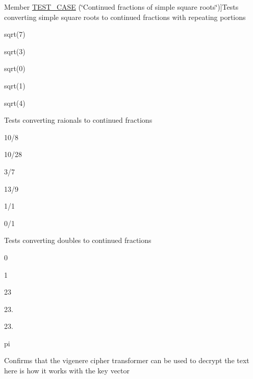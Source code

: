 \begin{DoxyRefList}
\hypertarget{test__test000014}{}%
Member \hyperlink{test__continuedfraction_8cpp_aa4e3cd0ec8e9303b450e5e393efa22b4}{T\+E\+S\+T\+\_\+\+C\+A\+SE} (\char`\"{}\+Continued fractions of simple square roots\char`\"{})]Tests converting simple square roots to continued fractions with repeating portions
\begin{DoxyItemize}
\item sqrt(7)
\item sqrt(3)
\item sqrt(0)
\item sqrt(1)
\item sqrt(4)  
\end{DoxyItemize}
\item[\label{test__test000013}%
\hypertarget{test__test000013}{}%
Member \hyperlink{test__continuedfraction_8cpp_a6494869677218c6bdd53aa492fbaa510}{T\+E\+S\+T\+\_\+\+C\+A\+SE} (\char`\"{}\+Fraction to continued fraction\char`\"{})]Tests converting raionals to continued fractions
\begin{DoxyItemize}
\item 10/8
\item 10/28
\item 3/7
\item 13/9
\item 1/1
\item 0/1  
\end{DoxyItemize}
\item[\label{test__test000012}%
\hypertarget{test__test000012}{}%
Member \hyperlink{test__continuedfraction_8cpp_ab53218170b1f0d7d03a10f9d7ef2d84b}{T\+E\+S\+T\+\_\+\+C\+A\+SE} (\char`\"{}\+Double to continued fraction\char`\"{})]Tests converting doubles to continued fractions
\begin{DoxyItemize}
\item 0
\item 1
\item 23
\item 23.
\item 23.
\item pi  
\end{DoxyItemize}
\item[\label{test__test000011}%
\hypertarget{test__test000011}{}%
Member \hyperlink{test__vigenere_8cpp_a74c0db7bf68a6157843e7bd2435270a5}{T\+E\+S\+T\+\_\+\+C\+A\+SE} (\char`\"{}\+Vigenere cipher decrypt\char`\"{})]Confirms that the vigenere cipher transformer can be used to decrypt the text \textquotesingle{}here is how it works\textquotesingle{} with the key \textquotesingle{}vector\textquotesingle{}  

\end{DoxyRefList}
